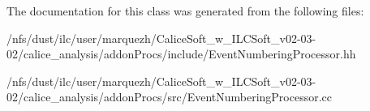 The documentation for this class was generated from the following files\-:\begin{DoxyCompactItemize}
\item 
/nfs/dust/ilc/user/marquezh/\-Calice\-Soft\-\_\-w\-\_\-\-I\-L\-C\-Soft\-\_\-v02-\/03-\/02/calice\-\_\-analysis/addon\-Procs/include/Event\-Numbering\-Processor.\-hh\item 
/nfs/dust/ilc/user/marquezh/\-Calice\-Soft\-\_\-w\-\_\-\-I\-L\-C\-Soft\-\_\-v02-\/03-\/02/calice\-\_\-analysis/addon\-Procs/src/Event\-Numbering\-Processor.\-cc\end{DoxyCompactItemize}

